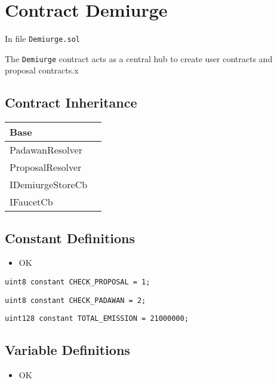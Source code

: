 
\chapter{Contract Demiurge}

\minitoc

In file {\tt Demiurge.sol}

The {\tt Demiurge} contract acts as a central hub to create user
contracts and proposal contracts.x

\section{Contract Inheritance}


\noindent\begin{tabular}{|l|p{5cm}|}\hline
Base & \\\hline
PadawanResolver & \\\hline
ProposalResolver & \\\hline
IDemiurgeStoreCb & \\\hline
IFaucetCb & \\\hline
\end{tabular}


\section{Constant Definitions}


\begin{itemize}
\item OK
\end{itemize}

\begin{lstlisting}[firstnumber=30]
    uint8 constant CHECK_PROPOSAL = 1;
\end{lstlisting}

\begin{lstlisting}[firstnumber=31]
    uint8 constant CHECK_PADAWAN = 2;
\end{lstlisting}

\begin{lstlisting}[firstnumber=33]
    uint128 constant TOTAL_EMISSION = 21000000;
\end{lstlisting}

\section{Variable Definitions}


\begin{itemize}
\item OK
\end{itemize}

